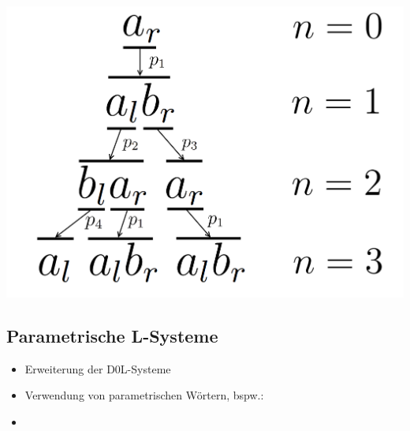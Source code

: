 \newpage

\begin{center}
	\includegraphics[height=1\textheight]{images/AnabaenaAbleitung.png}
\end{center}

\newpage
{}
\subsection{Parametrische L-Systeme\\ }

\begin{itemize}
	\item Erweiterung der D0L-Systeme \\
	
	\item Verwendung von parametrischen Wörtern, bspw.:

	\item 
\end{itemize}

